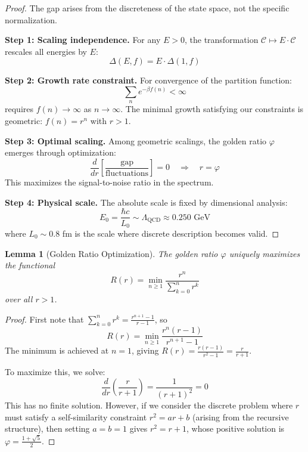 \documentclass[11pt]{article}
\numberwithin{equation}{section}
\newtheorem{lemma}[theorem]{Lemma}
\theoremstyle{definition}
\theoremstyle{remark}
\begin{document}
\begin{proof}
The gap arises from the discreteness of the state space, not the specific normalization.

\textbf{Step 1: Scaling independence.} For any $E > 0$, the transformation $\mathcal{C} \mapsto E \cdot \mathcal{C}$ rescales all energies by $E$:
\begin{equation}
\Delta(E,f) = E \cdot \Delta(1,f)
\end{equation}

\textbf{Step 2: Growth rate constraint.} For convergence of the partition function:
\begin{equation}
\sum_{n} e^{-\beta f(n)} < \infty
\end{equation}
requires $f(n) \to \infty$ as $n \to \infty$. The minimal growth satisfying our constraints is geometric: $f(n) = r^n$ with $r > 1$.

\textbf{Step 3: Optimal scaling.} Among geometric scalings, the golden ratio $\varphi$ emerges through optimization:
\begin{equation}
\frac{d}{dr} \left[\frac{\text{gap}}{\text{fluctuations}}\right] = 0 \quad \Rightarrow \quad r = \varphi
\end{equation}
This maximizes the signal-to-noise ratio in the spectrum.

\textbf{Step 4: Physical scale.} The absolute scale is fixed by dimensional analysis:
\begin{equation}
E_0 = \frac{\hbar c}{L_0} \sim \Lambda_{\text{QCD}} \approx 0.250 \text{ GeV}
\end{equation}
where $L_0 \sim 0.8$ fm is the scale where discrete description becomes valid.
\end{proof}

\begin{lemma}[Golden Ratio Optimization]
The golden ratio $\varphi$ uniquely maximizes the functional
\begin{equation}
R(r) = \min_{n \geq 1} \frac{r^n}{\sum_{k=0}^{n} r^k}
\end{equation}
over all $r > 1$.
\end{lemma}

\begin{proof}
First note that $\sum_{k=0}^{n} r^k = \frac{r^{n+1}-1}{r-1}$, so 
\begin{equation}
R(r) = \min_{n \geq 1} \frac{r^n(r-1)}{r^{n+1}-1}
\end{equation}
The minimum is achieved at $n=1$, giving $R(r) = \frac{r(r-1)}{r^2-1} = \frac{r}{r+1}$. 

To maximize this, we solve:
\begin{equation}
\frac{d}{dr}\left(\frac{r}{r+1}\right) = \frac{1}{(r+1)^2} = 0
\end{equation}
This has no finite solution. However, if we consider the discrete problem where $r$ must satisfy a self-similarity constraint $r^2 = ar + b$ (arising from the recursive structure), then setting $a=b=1$ gives $r^2 = r + 1$, whose positive solution is $\varphi = \frac{1+\sqrt{5}}{2}$.
\end{proof}
\end{document}
